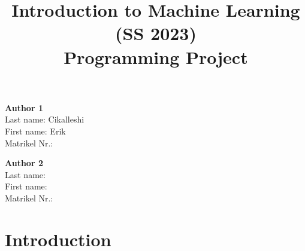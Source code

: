 \documentclass[a4, 10 pt, conference]{ieeeconf}  %
\title{\LARGE \bf
Introduction to Machine Learning (SS 2023)\\ Programming Project
\vspace{-3em}
}
\begin{document}
\maketitle
\vspace{-3em}
\thispagestyle{empty}
\pagestyle{empty}

\begin{strip}
  \begin{tcolorbox}[
      size=tight,
      colback=white,
      boxrule=0.2mm,
      left=3mm,right=3mm, top=3mm, bottom=1mm
    ]
    {\begin{multicols}{3}%

        \textbf{Author 1}       \\
        Last name: Cikalleshi             \\  %
        First name: Erik            \\  %
        Matrikel Nr.:               \\  %

        \columnbreak

        \textbf{Author 2}       \\
        Last name:             \\  %
        First name:             \\  %
        Matrikel Nr.:            \\  %

        \columnbreak


      \end{multicols}}
  \end{tcolorbox}
\end{strip}


\section{Introduction}
\label{sec:intro}
\end{document}
